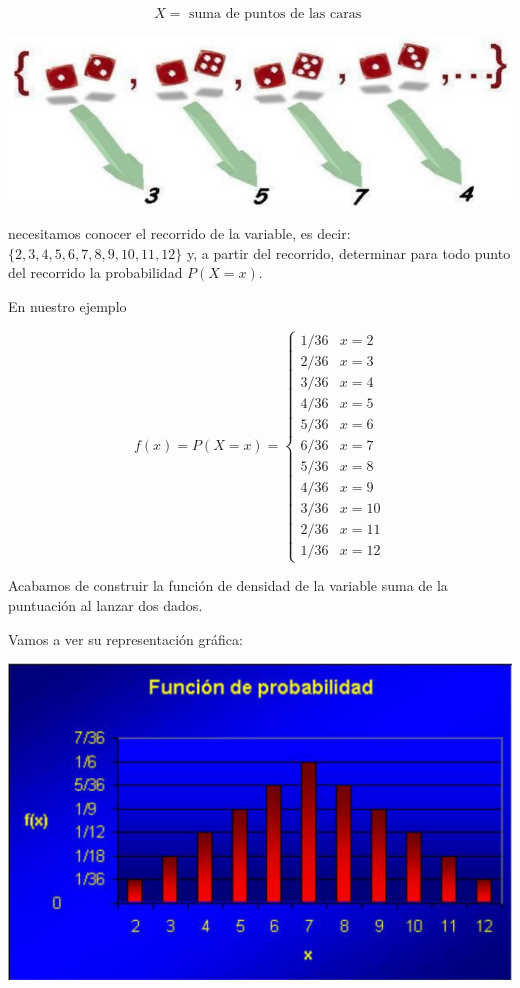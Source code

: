 \documentclass[
]{article}
\begin{document}
\[
X=\text { suma de puntos de las caras }
\]

\includegraphics{images/clipboard-2707476680.png}

necesitamos conocer el recorrido de la variable, es decir:
\(\{2,3,4,5,6,7,8,9,10,11, 12\}\) y, a partir del recorrido, determinar
para todo punto del recorrido la probabilidad \(P(X=x)\).

En nuestro ejemplo

\[
f(x)=P(X=x)= \begin{cases}1 / 36 & x=2 \\ 2 / 36 & x=3 \\ 3 / 36 & x=4 \\ 4 / 36 & x=5 \\ 5 / 36 & x=6 \\ 6 / 36 & x=7 \\ 5 / 36 & x=8 \\ 4 / 36 & x=9 \\ 3 / 36 & x=10 \\ 2 / 36 & x=11 \\ 1 / 36 & x=12\end{cases}
\]

Acabamos de construir la función de densidad de la variable suma de la
puntuación al lanzar dos dados.

Vamos a ver su representación gráfica:

\includegraphics[width=0.8\linewidth]{images/fmp2Dados}
\end{document}
